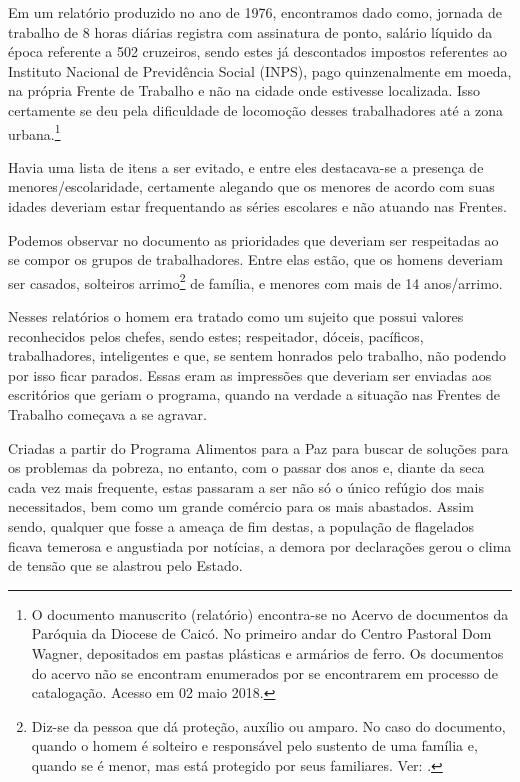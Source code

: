 \begin{refsection}
    Em um relatório produzido no ano de 1976, encontramos dado como, jornada de trabalho de 8 horas diárias registra com assinatura de ponto, salário líquido da época referente a 502 cruzeiros, sendo estes já descontados impostos referentes ao Instituto Nacional de Previdência Social (INPS), pago quinzenalmente em moeda, na própria Frente de Trabalho e não na cidade onde estivesse localizada. Isso certamente se deu pela dificuldade de locomoção desses trabalhadores até a zona urbana.\footnote{O documento manuscrito (relatório) encontra-se no Acervo de documentos da Paróquia da Diocese de Caicó. No primeiro andar do Centro Pastoral Dom Wagner, depositados em pastas plásticas e armários de ferro. Os documentos do acervo não se encontram enumerados por se encontrarem em processo de catalogação. Acesso em 02 maio 2018.}

    Havia uma lista de itens a ser evitado, e entre eles destacava-se a presença de menores/escolaridade, certamente alegando que os menores de acordo com suas idades deveriam estar frequentando as séries escolares e não atuando nas Frentes.

    Podemos observar no documento as prioridades que deveriam ser respeitadas ao se compor os grupos de trabalhadores. Entre elas estão, que os homens deveriam ser casados, solteiros arrimo\footnote{Diz-se da pessoa que dá proteção, auxílio ou amparo. No caso do documento, quando o homem é solteiro e responsável pelo sustento de uma família e, quando se é menor, mas está protegido por seus familiares. Ver: .} de família, e menores com mais de 14 anos/arrimo.

    Nesses relatórios o homem era tratado como um sujeito que possui valores reconhecidos pelos chefes, sendo estes; respeitador, dóceis, pacíficos, trabalhadores, inteligentes e que, se sentem honrados pelo trabalho, não podendo por isso ficar parados. Essas eram as impressões que deveriam ser enviadas aos escritórios que geriam o programa, quando na verdade a situação nas Frentes de Trabalho começava a se agravar.

    Criadas a partir do Programa Alimentos para a Paz para buscar de soluções para os problemas da pobreza, no entanto, com o passar dos anos e, diante da seca cada vez mais frequente, estas passaram a ser não só o único refúgio dos mais necessitados, bem como um grande comércio para os mais abastados. Assim sendo, qualquer que fosse a ameaça de fim destas, a população de flagelados ficava temerosa e angustiada por notícias, a demora por declarações gerou o clima de tensão que se alastrou pelo Estado.  


\end{refsection}
